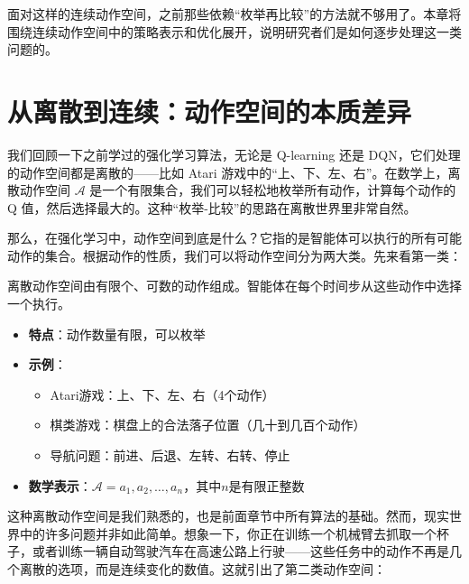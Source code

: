 \documentclass[lang=cn,zihao=-4,a4paper,fontset=windows]{beautybook}
\begin{document}
面对这样的连续动作空间，之前那些依赖“枚举再比较”的方法就不够用了。本章将围绕连续动作空间中的策略表示和优化展开，说明研究者们是如何逐步处理这一类问题的。

\section{从离散到连续：动作空间的本质差异}

我们回顾一下之前学过的强化学习算法，无论是 Q-learning 还是 DQN，它们处理的动作空间都是离散的——比如 Atari 游戏中的“上、下、左、右”。在数学上，离散动作空间 $\mathcal{A}$ 是一个有限集合，我们可以轻松地枚举所有动作，计算每个动作的 Q 值，然后选择最大的。这种“枚举-比较”的思路在离散世界里非常自然。

那么，在强化学习中，动作空间到底是什么？它指的是智能体可以执行的所有可能动作的集合。根据动作的性质，我们可以将动作空间分为两大类。先来看第一类：

\begin{definition}
离散动作空间由有限个、可数的动作组成。智能体在每个时间步从这些动作中选择一个执行。
\begin{itemize}
\item \textbf{特点}：动作数量有限，可以枚举
\item \textbf{示例}：
\begin{itemize}
\item Atari游戏：上、下、左、右（4个动作）
\item 棋类游戏：棋盘上的合法落子位置（几十到几百个动作）
\item 导航问题：前进、后退、左转、右转、停止
\end{itemize}
\item \textbf{数学表示}：$\mathcal{A} = {a_1, a_2, \dots, a_n}$，其中$n$是有限正整数
\end{itemize}
\end{definition}

这种离散动作空间是我们熟悉的，也是前面章节中所有算法的基础。然而，现实世界中的许多问题并非如此简单。想象一下，你正在训练一个机械臂去抓取一个杯子，或者训练一辆自动驾驶汽车在高速公路上行驶——这些任务中的动作不再是几个离散的选项，而是连续变化的数值。这就引出了第二类动作空间：
\end{document}
